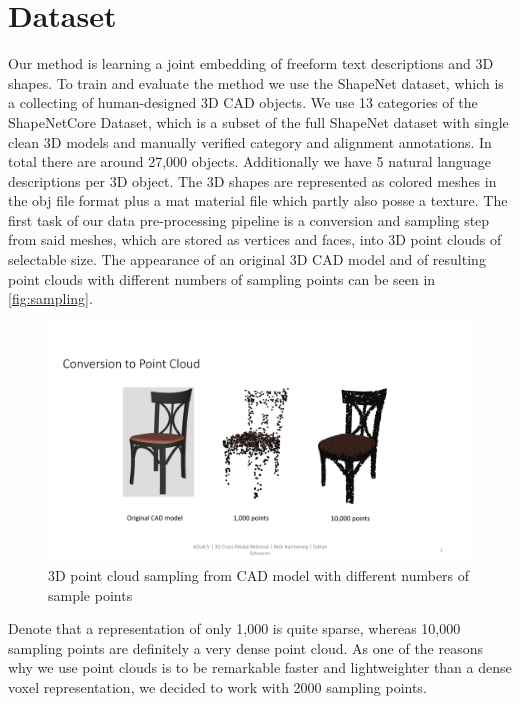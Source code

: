\documentclass[10pt,twocolumn,letterpaper]{article}
\begin{document}
\section{Dataset}
Our method is learning a joint embedding of freeform text descriptions and 3D shapes. To train and evaluate the method we use the ShapeNet \cite{Chang2015Shapenet} dataset, which is a collecting of human-designed 3D CAD objects. We use 13 categories of the ShapeNetCore Dataset, which is a subset of the full ShapeNet dataset with single clean 3D models and manually verified category and alignment annotations. In total there are around 27,000 objects. Additionally we have 5 natural language descriptions per 3D object. The 3D shapes are represented as colored meshes in the obj file format plus a mat material file which partly also posse a texture.
The first task of our data pre-processing pipeline is a conversion and sampling step from said meshes, which are stored as vertices and faces, into 3D point clouds of selectable size. The appearance of an original 3D CAD model and of resulting point clouds with different numbers of sampling points can be seen in \autoref{fig:sampling}.
\begin{figure}[t]%
	\centering
	\includegraphics[width=0.8\linewidth]{fig2.pdf}
	\caption[]{3D point cloud sampling from CAD model with different numbers of sample points}
	\label{fig:sampling}
\end{figure}
Denote that a representation of only 1,000 is quite sparse, whereas 10,000 sampling points are definitely a very dense point cloud. As one of the reasons why we use point clouds is to be remarkable faster and lightweighter than a dense voxel representation, we decided to work with 2000 sampling points. 
\end{document}
